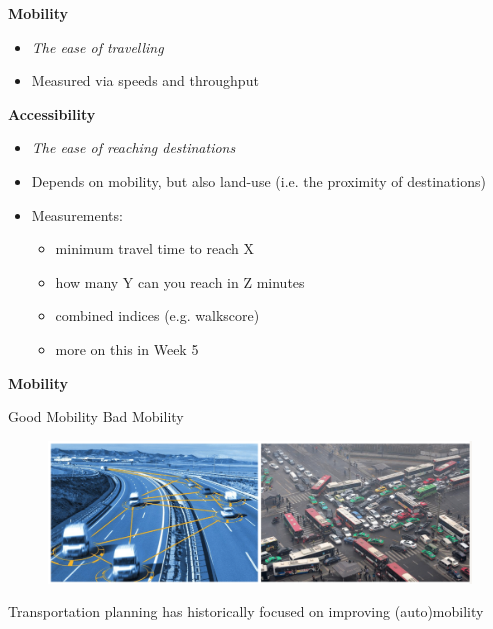 \documentclass[aspectratio=169]{beamer}
\begin{document}
\begin{frame}
	
	\textbf{Mobility}
	\begin{itemize}
		\item \textit{The ease of travelling}
		\item Measured via speeds and throughput
	\end{itemize}
	
	\textbf{Accessibility}
	\begin{itemize}
		\item \textit{The ease of reaching destinations}
		\item Depends on mobility, but also land-use (i.e. the proximity of destinations)
		\item Measurements: 
		\begin{itemize}
			\item minimum travel time to reach X
			\item how many Y can you reach in Z minutes
			\item combined indices (e.g. walkscore)
			\item more on this in Week 5
		\end{itemize}
	\end{itemize}
	
\end{frame}





\begin{frame}
	
	\textbf{Mobility}
	
	\vspace{4mm}
	
	Good Mobility \hspace{38mm} Bad Mobility
	
	
	\begin{figure}
		\centering
		\includegraphics[width=1\linewidth]{images/mobility-good-bad.png}
		
	\end{figure}
	
	Transportation planning has historically focused on improving (auto)mobility
	
	
\end{frame}
\end{document}
